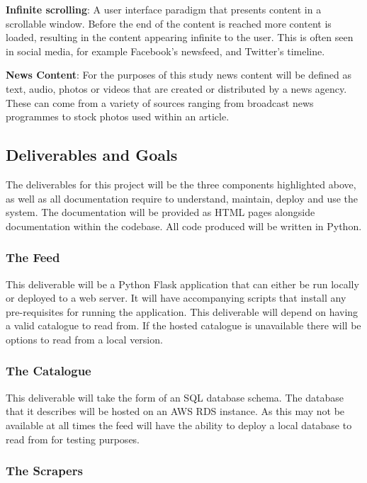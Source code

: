 \documentclass[12pt,titlepage]{article}
\begin{document}
  \textbf{Infinite scrolling}: A user interface paradigm that presents content in a
  scrollable window. Before the end of the content is reached more content is
  loaded, resulting in the content appearing infinite to the user. This is often
  seen in social media, for example Facebook's newsfeed, and Twitter's timeline.

  \textbf{News Content}: For the purposes of this study news content will be
  defined as text, audio, photos or videos that are created or distributed by a
  news agency. These can come from a variety of sources ranging from broadcast
  news programmes to stock photos used within an article.

  \subsection{Deliverables and Goals}

  The deliverables for this project will be the three components highlighted
  above, as well as all documentation require to understand, maintain, deploy
  and use the system. The documentation will be provided as HTML pages alongside
  documentation within the codebase. All code produced will be written in
  Python.

    \subsubsection{The Feed}

    This deliverable will be a Python Flask application that can either be run
    locally or deployed to a web server. It will have accompanying scripts that
    install any pre-requisites for running the application. This deliverable
    will depend on having a valid catalogue to read from. If the hosted
    catalogue is unavailable there will be options to read from a local version.

    \subsubsection{The Catalogue}

    This deliverable will take the form of an SQL database schema. The database
    that it describes will be hosted on an AWS RDS instance. As this may not be
    available at all times the feed will have the ability to deploy a local
    database to read from for testing purposes.

    \subsubsection{The Scrapers}
\end{document}
